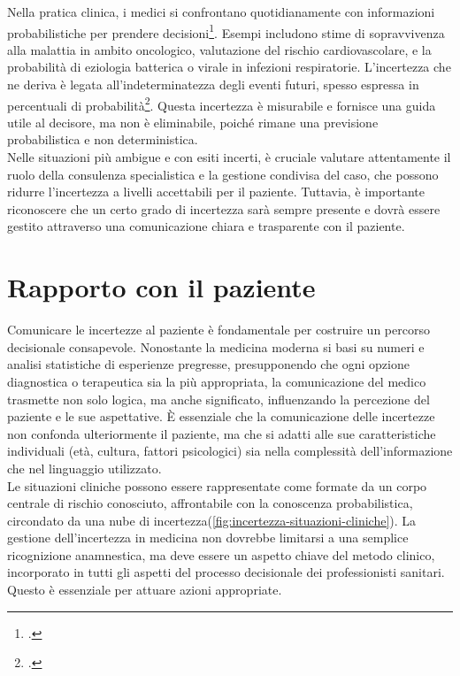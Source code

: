 Nella pratica clinica, i medici si confrontano quotidianamente con informazioni probabilistiche per prendere decisioni\footcite{womak:arte-probabilita-coen}. Esempi includono stime di sopravvivenza alla malattia in ambito oncologico, valutazione del rischio cardiovascolare, e la probabilità di eziologia batterica o virale in infezioni respiratorie. L'incertezza che ne deriva è legata all'indeterminatezza degli eventi futuri, spesso espressa in percentuali di probabilità\footcite{womak:recenti-progressi-medicina}. Questa incertezza è misurabile e fornisce una guida utile al decisore, ma non è eliminabile, poiché rimane una previsione probabilistica e non deterministica.\\
Nelle situazioni più ambigue e con esiti incerti, è cruciale valutare attentamente il ruolo della consulenza specialistica e la gestione condivisa del caso, che possono ridurre l'incertezza a livelli accettabili per il paziente. Tuttavia, è importante riconoscere che un certo grado di incertezza sarà sempre presente e dovrà essere gestito attraverso una comunicazione chiara e trasparente con il paziente.


\section{Rapporto con il paziente}

Comunicare le incertezze al paziente è fondamentale per costruire un percorso decisionale consapevole. Nonostante la medicina moderna si basi su numeri e analisi statistiche di  esperienze pregresse, presupponendo che ogni opzione diagnostica o terapeutica sia la più appropriata, la comunicazione del medico trasmette non solo logica, ma anche significato, influenzando la percezione del paziente e le sue aspettative. È essenziale che la comunicazione delle incertezze non confonda ulteriormente il paziente, ma che si adatti alle sue caratteristiche individuali (età, cultura, fattori psicologici) sia nella complessità dell'informazione che nel linguaggio utilizzato.\\

Le situazioni cliniche possono essere rappresentate come formate da un corpo centrale di rischio conosciuto, affrontabile con la conoscenza probabilistica, circondato da una nube di incertezza(\ref{fig:incertezza-situazioni-cliniche}). La gestione dell'incertezza in medicina non dovrebbe limitarsi a una semplice ricognizione anamnestica, ma deve essere un aspetto chiave del metodo clinico, incorporato in tutti gli aspetti del processo decisionale dei professionisti sanitari. Questo è essenziale per attuare azioni appropriate.\\

